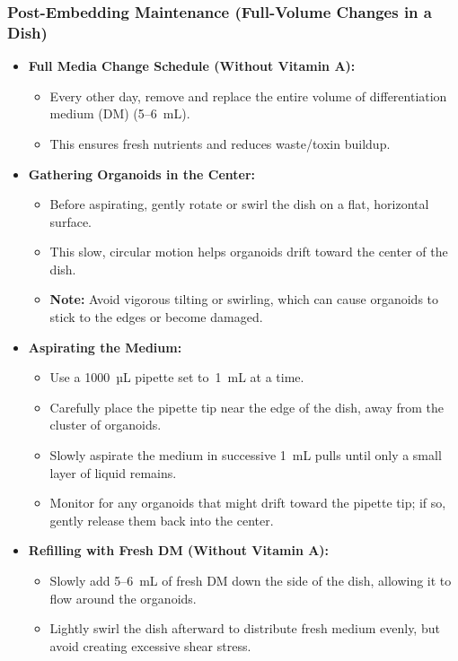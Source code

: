 \documentclass[11pt]{article}
\begin{document}
\subsubsection{Post-Embedding Maintenance (Full-Volume Changes in a Dish)}
\begin{itemize}[leftmargin=*]
    \item \textbf{Full Media Change Schedule (Without Vitamin A):}
    \begin{itemize}[leftmargin=*]
        \item Every other day, remove and replace the entire volume of differentiation medium (DM) (5--6~mL).
        \item This ensures fresh nutrients and reduces waste/toxin buildup.
    \end{itemize}

    \item \textbf{Gathering Organoids in the Center:}
    \begin{itemize}[leftmargin=*]
        \item Before aspirating, gently rotate or swirl the dish on a flat, horizontal surface.
        \item This slow, circular motion helps organoids drift toward the center of the dish.
        \item \textbf{Note:} Avoid vigorous tilting or swirling, which can cause organoids to stick to the edges or become damaged.
    \end{itemize}

    \item \textbf{Aspirating the Medium:}
    \begin{itemize}[leftmargin=*]
        \item Use a 1000~µL pipette set to~1~mL at a time.
        \item Carefully place the pipette tip near the edge of the dish, away from the cluster of organoids.
        \item Slowly aspirate the medium in successive 1~mL pulls until only a small layer of liquid remains.
        \item Monitor for any organoids that might drift toward the pipette tip; if so, gently release them back into the center.
    \end{itemize}

    \item \textbf{Refilling with Fresh DM (Without Vitamin A):}
    \begin{itemize}[leftmargin=*]
        \item Slowly add 5--6~mL of fresh DM down the side of the dish, allowing it to flow around the organoids.
        \item Lightly swirl the dish afterward to distribute fresh medium evenly, but avoid creating excessive shear stress.
    \end{itemize}


\end{itemize}
\end{document}
